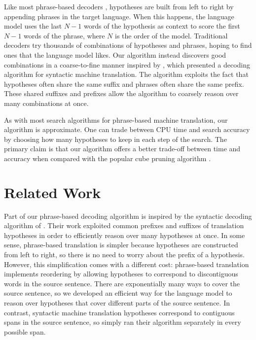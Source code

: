 \documentclass[11pt]{article}
\begin{document}
Like most phrase-based decoders \cite{pharaoh}, hypotheses are built from left to right by appending phrases in the target language.  When this happens, the language model uses the last $N-1$ words of the hypothesis as context to score the first $N-1$ words of the phrase, where $N$ is the order of the model.  Traditional decoders \cite{cubit} try thousands of combinations of hypotheses and phrases, hoping to find ones that the language model likes.  Our algorithm instead discovers good combinations in a coarse-to-fine manner inspired by , which presented a decoding algorithm for syntactic machine translation.  The algorithm exploits the fact that hypotheses often share the same suffix and phrases often share the same prefix.  These shared suffixes and prefixes allow the algorithm to coarsely reason over many combinations at once.   


As with most search algorithms for phrase-based machine translation, our algorithm is approximate.  One can trade between CPU time and search accuracy by choosing how many hypotheses to keep in each step of the search.  The primary claim is that our algorithm offers a better trade-off between time and accuracy when compared with the popular cube pruning algorithm \cite{cubit}.  

\section{Related Work}
Part of our phrase-based decoding algorithm is inspired by the syntactic decoding algorithm of .  Their work exploited common prefixes and suffixes of translation hypotheses in order to efficiently reason over many hypotheses at once.  In some sense, phrase-based translation is simpler because hypotheses are constructed from left to right, so there is no need to worry about the prefix of a hypothesis.  However, this simplification comes with a different cost: phrase-based translation implements reordering by allowing hypotheses to correspond to discontiguous words in the source sentence.  There are exponentially many ways to cover the source sentence, so we developed an efficient way for the language model to reason over hypotheses that cover different parts of the source sentence.  In contrast, syntactic machine translation hypotheses correspond to contiguous spans in the source sentence, so  simply ran their algorithm separately in every possible span.  
\end{document}
